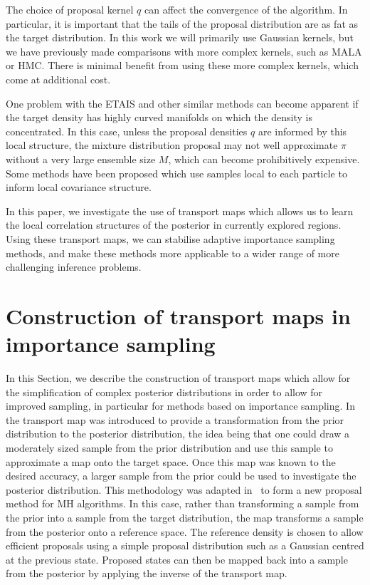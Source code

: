 \documentclass[final]{siamltex}
\newcommand{\edit}[1]{{\color{red} #1}}
\begin{document}
\edit{The choice of proposal kernel $q$ can affect the convergence of
  the algorithm. In particular, it is important that the tails of the
  proposal distribution are as fat as the target distribution. In this
  work we will primarily use Gaussian kernels, but we have previously
  made comparisons with more complex kernels, such as MALA or
  HMC\cite{cotter2015parallel,russ2017parallel}. There is minimal
  benefit from using these more complex kernels, which come at
  additional cost.}



One problem with the ETAIS and other similar methods can become apparent if
the target density has highly curved manifolds on which the density is
concentrated. In this
case, unless the proposal densities $q$ are informed by this local
structure, the mixture distribution proposal may not well approximate
$\pi$ without a very large ensemble size $M$, which can become
prohibitively expensive. Some methods have been
proposed\cite{douc2007minimum}
which use samples local to each particle to inform local covariance
structure.

\edit{In this paper, we investigate the use of transport maps which allows
us to learn the local correlation structures of the posterior in
currently explored regions. Using these transport maps, we can
stabilise adaptive importance sampling methods, and make these methods
more applicable to a wider range of more challenging inference problems.}

\section{Construction of transport maps in importance sampling} \label{sec:map}
In this Section, we describe the construction of transport maps which
allow for the simplification of complex posterior distributions in
order to allow for improved sampling, in particular for methods based
on importance sampling.
In~\cite{el2012bayesian} the transport map was introduced to provide a transformation from the prior
distribution to the posterior distribution, the idea being that one could draw a moderately sized
sample from the prior distribution and use this sample to approximate a map onto the target space.
Once this map was known to the desired accuracy, a larger sample from the prior could be used to
investigate the posterior distribution. This
methodology was adapted in~\cite{parno2018transport} to form a new proposal method for MH
algorithms. In this case, rather than transforming a sample from the prior into a sample from the target
distribution, the map transforms a sample from the posterior onto a reference space.
The reference density is chosen to allow efficient proposals using a simple proposal
distribution such as a Gaussian centred at the previous state. Proposed states can then be mapped back into a sample from the posterior by applying the inverse of the transport map.
\end{document}
